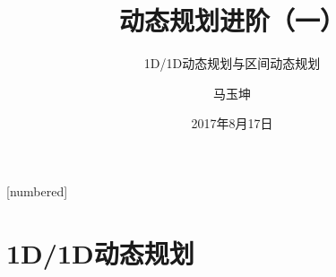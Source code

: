 \documentclass[hyperref={unicode=true}]{beamer}
\theoremstyle{definition}
\theoremstyle{proof}
\begin{document}
[numbered]
\renewcommand\figurename{图}
\renewcommand\tablename{表}
\renewcommand\contentsname{\centering 目录}


\title{动态规划进阶（一）}
\subtitle{1D/1D动态规划与区间动态规划}
\author{马玉坤}
\date{2017年8月17日}

\begin{frame}\titlepage\end{frame}

\begin{frame}\tableofcontents\end{frame}
\section{1D/1D动态规划}
\end{document}
